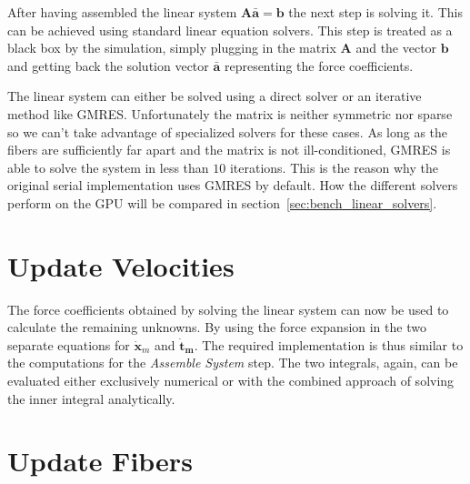 \documentclass[a4paper,11pt]{kth-mag}
\begin{document}
After having assembled the linear system $\mathbf{A}\mathbf{\bar{a}}=\mathbf{b}$ the next step is solving it. This can be achieved using standard linear equation solvers. This step is treated as a black box by the simulation, simply plugging in the matrix $\mathbf{A}$ and the vector $\mathbf{b}$ and getting back the solution vector $\mathbf{\bar{a}}$ representing the force coefficients.

The linear system can either be solved using a direct solver or an iterative method like GMRES. Unfortunately the matrix is neither symmetric nor sparse so we can't take advantage of specialized solvers for these cases. As long as the fibers are sufficiently far apart and the matrix is not ill-conditioned, GMRES is able to solve the system in less than $10$ iterations. This is the reason why the original serial implementation uses GMRES by default. How the different solvers perform on the GPU will be compared in section~\ref{sec:bench_linear_solvers}.

\section{Update Velocities}

The force coefficients obtained by solving the linear system can now be used to calculate the remaining unknowns. By using the force expansion in the two separate equations for $\mathbf{\dot{x}}_m$ and $\mathbf{\dot{t}_m}$. The required implementation is thus similar to the computations for the \emph{Assemble System} step. The two integrals, again, can be evaluated either exclusively numerical or with the combined approach of solving the inner integral analytically.

\section{Update Fibers}
\label{sec:serial_update_fibers}
\end{document}
